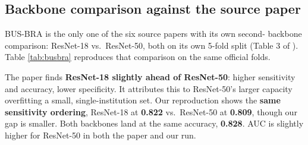 \documentclass[11pt]{article}
\begin{document}
\subsection{Backbone comparison against the source paper}

BUS-BRA is the only one of the six source papers with its own second-
backbone comparison: ResNet-18 vs.\ ResNet-50, both on its own 5-fold split
(Table 3 of \citealp{gomezflores2024busbra}). Table \ref{tab:busbra}
reproduces that comparison on the same official folds.

\begin{table}[htbp]
  \centering
  \caption{BUS-BRA: ResNet-18 vs.\ ResNet-50, our reproduction vs.\ the source paper \citep{gomezflores2024busbra}, official 5-fold CV (mean $\pm$ std).}
  \label{tab:busbra}
\end{table}

The paper finds \textbf{ResNet-18 slightly ahead of ResNet-50}: higher
sensitivity and accuracy, lower specificity. It attributes this to
ResNet-50's larger capacity overfitting a small, single-institution set.
Our reproduction shows the \textbf{same sensitivity ordering}, ResNet-18 at
\textbf{0.822} vs.\ ResNet-50 at \textbf{0.809}, though our gap is smaller.
Both backbones land at the same accuracy, \textbf{0.828}. AUC is slightly
higher for ResNet-50 in both the paper and our run.
\end{document}
